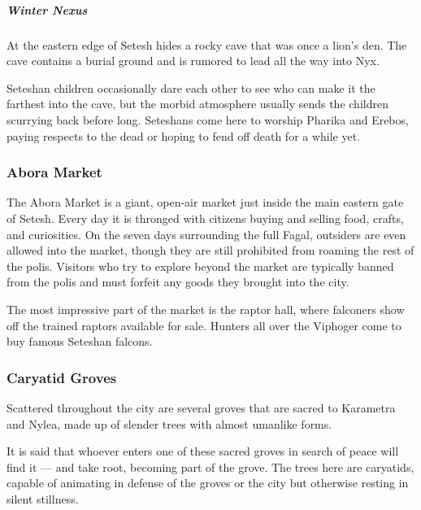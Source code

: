         \subparagraph{Winter Nexus} At the eastern edge of Setesh hides a rocky cave that was once a lion's den.
        The cave contains a burial ground and is rumored to lead all the way into Nyx.

        Seteshan children occasionally dare each other to see who can make it the farthest into the cave, but the morbid atmosphere usually sends the children scurrying back before long.
        Seteshans come here to worship Pharika and Erebos, paying respects to the dead or hoping to fend off death for a while yet.

    \subsubsection{Abora Market}
        The Abora Market is a giant, open-air market just inside the main eastern gate of Setesh.
        Every day it is thronged with citizens buying and selling food, crafts, and curiosities.
        On the seven days surrounding the full Fagal, outsiders are even allowed into the market, though they are still prohibited from roaming the rest of the polis.
        Visitors who try to explore beyond the market are typically banned from the polis and must forfeit any goods they brought into the city.

        The most impressive part of the market is the raptor hall, where falconers show off the trained raptors available for sale.
        Hunters all over the Viphoger come to buy famous Seteshan falcons.

    \subsubsection{Caryatid Groves}
        Scattered throughout the city are several groves that are sacred to Karametra and Nylea, made up of slender trees with almost umanlike forms.


        It is said that whoever enters one of these sacred groves in search of peace will find it --- and take root, becoming part of the grove.
        The trees here are caryatids, capable of animating in defense of the groves or the city but otherwise resting in silent stillness.

